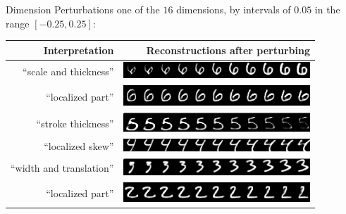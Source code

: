 \documentclass{beamer}
\begin{document}
{    \begin{frame}{Dimension Perturbations}
      one of the $16$ dimensions, by intervals of $0.05$ in the range $[-0.25, 0.25]$:
      \pause

      \begin{tabular}{r | r}
        Interpretation & Reconstructions after perturbing \\
        \hline
        ``scale and thickness'' & \includegraphics[width=7cm]{../img/recons/dim6} \\
        ``localized part'' & \includegraphics[width=7cm]{../img/recons/dim7} \\
        \pause
        ``stroke thickness'' & \includegraphics[width=7cm]{../img/recons/dim8} \\
        ``localized skew'' & \includegraphics[width=7cm]{../img/recons/dim12} \\
        \pause
        ``width and translation'' & \includegraphics[width=7cm]{../img/recons/dim10} \\
        ``localized part'' & \includegraphics[width=7cm]{../img/recons/dim11}
      \end{tabular}
    \end{frame}
  }
\end{document}
